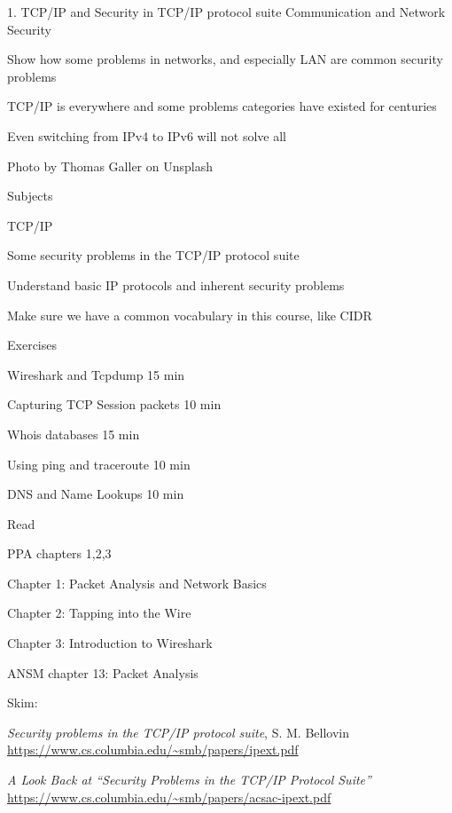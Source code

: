 \documentclass[Screen16to9,17pt]{foils}
\begin{document}
\mytitlepage
{1. TCP/IP and Security in TCP/IP protocol suite}
{Communication and Network Security \the\year}



\begin{list2}
\item Show how some problems in networks, and especially LAN are common security problems
\item TCP/IP is everywhere and some problems categories have existed for centuries
\item Even switching from IPv4 to IPv6 will not solve all
\end{list2}

Photo by Thomas Galler on Unsplash



\begin{list1}
\item Subjects
\begin{list2}
\item TCP/IP
\item Some security problems in the TCP/IP protocol suite
\item Understand basic IP protocols and inherent security problems
\item Make sure we have a common vocabulary in this course, like CIDR
\end{list2}
\item Exercises
\begin{list2}
\item Wireshark and Tcpdump 15 min
\item Capturing TCP Session packets 10 min
\item Whois databases 15 min
\item Using ping and traceroute 10 min
\item DNS and Name Lookups 10 min
\end{list2}
\end{list1}


Read
\begin{list2}
\item PPA chapters 1,2,3
\item Chapter 1: Packet Analysis and Network Basics
\item Chapter 2: Tapping into the Wire
\item Chapter 3: Introduction to Wireshark
\item ANSM chapter 13: Packet Analysis
\end{list2}
Skim:
\begin{list2}
\item
\emph{Security problems in the TCP/IP protocol suite}, S. M. Bellovin \url{https://www.cs.columbia.edu/~smb/papers/ipext.pdf}
\item \emph{A Look Back at “Security Problems in the TCP/IP Protocol Suite”} \url{https://www.cs.columbia.edu/~smb/papers/acsac-ipext.pdf}
\end{list2}
\end{document}
